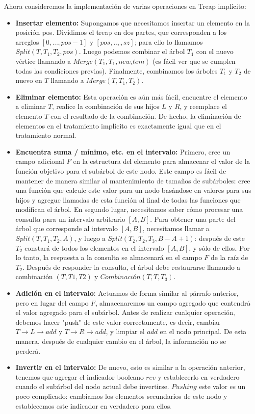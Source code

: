 \documentclass[12pt]{article}
\newcommand{\nl}{\vspace{0.3cm}}
\begin{document}
\nl

Ahora consideremos la implementación de varias operaciones en Treap implícito:

\nl

\begin{itemize}
	\item \textbf{Insertar elemento:} Supongamos que necesitamos insertar un elemento en la posición pos. Dividimos el treap en dos partes, que corresponden a los arreglos $[0, ..., pos-1]$ y $[pos, .., , sz]$; para ello lo llamamos $Split(T, T_1, T_2, pos)$. Luego podemos combinar el árbol $T_1$ con el nuevo vértice llamando a $Merge(T_1, T_1, new_item)$ (es fácil ver que se cumplen todas las condiciones previas). Finalmente, combinamos los árboles $T_1$ y $T_2$ de nuevo en $T$ llamando a $Merge(T, T_1, T_2)$.
	\item \textbf{Eliminar elemento:} Esta operación es aún más fácil, encuentre el elemento a eliminar $T$, realice la combinación de sus hijos $L$ y $R$, y reemplace el elemento $T$ con el resultado de la combinación. De hecho, la eliminación de elementos en el tratamiento implícito es exactamente igual que en el tratamiento normal.
	\item \textbf{Encuentra suma / mínimo, etc. en el intervalo:} Primero, cree un campo adicional $F$ en la estructura del elemento para almacenar el valor de la función objetivo para el subárbol de este nodo. Este campo es fácil de mantener de manera similar al mantenimiento de tamaños de subárboles: cree una función que calcule este valor para un nodo basándose en valores para sus hijos y agregue llamadas de esta función al final de todas las funciones que modifican el árbol.
	En segundo lugar, necesitamos saber cómo procesar una consulta para un intervalo arbitrario $[A, B]$. Para obtener una parte del árbol que corresponde al intervalo $[A, B]$, necesitamos llamar a $Split(T, T_1, T_2, A)$, y luego a $Split(T_2, T_2, T_3, B - A + 1)$: después de este $T_2$ constará de todos los elementos en el intervalo $[A, B]$, y sólo de ellos. Por lo tanto, la respuesta a la consulta se almacenará en el campo $F$ de la raíz de $T_2$. Después de responder la consulta, el árbol debe restaurarse llamando a combinación $(T, T1, T2)$ y $Combinación(T, T, T_3)$.
	\item \textbf{Adición en el intervalo:} Actuamos de forma similar al párrafo anterior, pero en lugar del campo $F$, almacenaremos un campo agregado que contendrá el valor agregado para el subárbol. Antes de realizar cualquier operación, debemos hacer "push" de este valor correctamente, es decir, cambiar $T \rightarrow L \rightarrow add$ y $T \rightarrow R \rightarrow add$, y limpiar el $add$ en el nodo principal. De esta manera, después de cualquier cambio en el árbol, la información no se perderá.
	\item \textbf{Invertir en el intervalo:} De nuevo, esto es similar a la operación anterior, tenemos que agregar el indicador booleano $rev$ y establecerlo en verdadero cuando el subárbol del nodo actual debe invertirse. $Pushing$ este valor es un poco complicado: cambiamos los elementos secundarios de este nodo y establecemos este indicador en verdadero para ellos.
\end{itemize}
\end{document}
